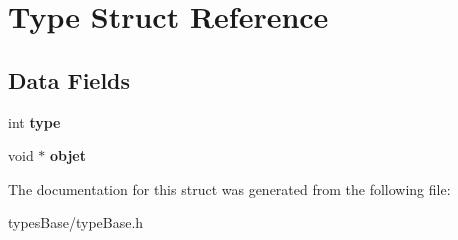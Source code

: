 \hypertarget{struct_type}{\section{Type Struct Reference}
\label{struct_type}
}
\subsection*{Data Fields}
\begin{DoxyCompactItemize}
\item 
\hypertarget{struct_type_ac765329451135abec74c45e1897abf26}{int {\bfseries type}}\label{struct_type_ac765329451135abec74c45e1897abf26}

\item 
\hypertarget{struct_type_aa904075f3da1256ca09f3ba3fb440c93}{void $\ast$ {\bfseries objet}}\label{struct_type_aa904075f3da1256ca09f3ba3fb440c93}

\end{DoxyCompactItemize}


The documentation for this struct was generated from the following file\+:\begin{DoxyCompactItemize}
\item 
types\+Base/type\+Base.\+h\end{DoxyCompactItemize}
